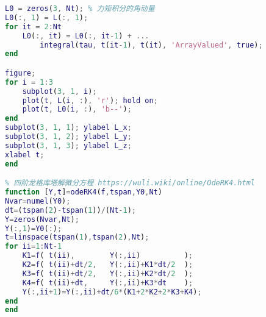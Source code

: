 \begin{lstlisting}[language=matlab, caption=rigBdRot.m]
L0 = zeros(3, Nt); % 力矩积分的角动量
L0(:, 1) = L(:, 1);
for it = 2:Nt
    L0(:, it) = L0(:, it-1) + ...
        integral(tau, t(it-1), t(it), 'ArrayValued', true);
end

figure;
for i = 1:3
    subplot(3, 1, i);
    plot(t, L(i, :), 'r'); hold on;
    plot(t, L0(i, :), 'b--');
end
subplot(3, 1, 1); ylabel L_x;
subplot(3, 1, 2); ylabel L_y;
subplot(3, 1, 3); ylabel L_z;
xlabel t;
end

% 四阶龙格库塔解微分方程 https://wuli.wiki/online/OdeRK4.html
function [Y,t]=odeRK4(f,tspan,Y0,Nt)
Nvar=numel(Y0);
dt=(tspan(2)-tspan(1))/(Nt-1);
Y=zeros(Nvar,Nt);
Y(:,1)=Y0(:);
t=linspace(tspan(1),tspan(2),Nt);
for ii=1:Nt-1
    K1=f( t(ii),        Y(:,ii)          );
    K2=f( t(ii)+dt/2,   Y(:,ii)+K1*dt/2  );
    K3=f( t(ii)+dt/2,   Y(:,ii)+K2*dt/2  );
    K4=f( t(ii)+dt,     Y(:,ii)+K3*dt    );
    Y(:,ii+1)=Y(:,ii)+dt/6*(K1+2*K2+2*K3+K4);
end
end
\end{lstlisting}
